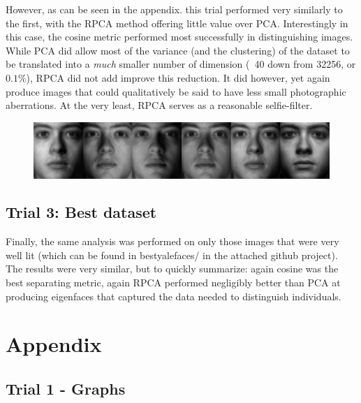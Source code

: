 \documentclass[11pt]{scrartcl} %
\theoremstyle{plain}
\begin{document}
However, as can be seen in the appendix. this trial performed very similarly to the first, with the RPCA method offering little value over PCA. Interestingly in this case, the cosine metric performed most successfully in distinguishing images. While PCA did allow most of the variance (and the clustering) of the dataset to be translated into a \emph{much} smaller  number of dimension (~40 down from 32256, or $0.1\%$), RPCA did not add improve this reduction. It did however, yet again produce images that could qualitatively be said to have less small photographic aberrations. At the very least, RPCA serves as a reasonable selfie-filter.

\begin{figure}[H]
\includegraphics[width=\textwidth]{figures/person24Afterl=0dot005RPCAtrial2.jpg} 
\centering
\end{figure}

\subsection{Trial 3: Best dataset}

Finally, the same analysis was performed on only those images that were very well lit (which can be found in bestyalefaces/ in the attached github project). The results were very similar, but to quickly summarize: again cosine was the best separating metric, again RPCA performed negligibly better than PCA at producing eigenfaces that captured the data needed to distinguish individuals. 

\newpage

\section{Appendix}

\subsection{Trial 1 - Graphs}
\end{document}
